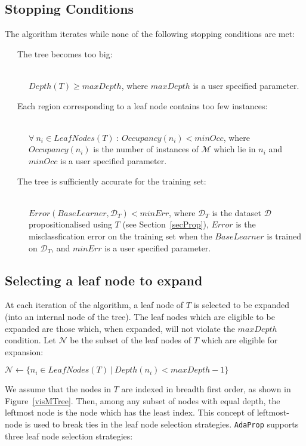 \documentclass[a4paper,12pt]{report} %
\newcommand{\AdaProp}{\texttt{AdaProp}\xspace}
\newcommand{\mcl}[1]{\mathcal{#1}}
\begin{document}
\pagebreak

\subsection{Stopping Conditions}
\label{secStopCond}

The algorithm iterates while none of the following stopping conditions are met:
\begin{description}

\item[~~~The tree becomes too big:] \ \\
    $Depth(T) \geq maxDepth$, 
    where  $maxDepth$ is a user specified parameter.
\item[~~~Each region corresponding to a leaf node contains too few instances:] \ \\ 
    $\forall~n_i \in LeafNodes(T) ~:~ Occupancy(n_i) < minOcc$, 
    where $Occupancy(n_i)$ is the number of instances of $\mcl{M}$ which lie in $n_i$ and
    $minOcc$ is a user specified parameter.
\item[~~~The tree is sufficiently accurate for the training set:] \ \\
    $Error(BaseLearner, \mcl{D}_T) < minErr$, 
    where $\mcl{D}_T$ is the dataset $\mcl{D}$ propositionalised using $T$ (see Section~\ref{secProp}),
    $Error$ is the misclassfication error on the training set when 
    the $BaseLearner$ is trained on $\mcl{D}_T$,
    and $minErr$ is a user specified parameter.

\end{description}

\subsection{Selecting a leaf node to expand}
\label{secTreeBuild}

At each iteration of the algorithm, 
    a leaf node of $T$ is selected to be expanded 
    (into an internal node of the tree).
The leaf nodes which are eligible to be expanded
    are those which, when expanded, will not 
    violate the $maxDepth$ condition.
Let $\mcl{N}$ be the subset of the leaf nodes of $T$ 
    which are eligible for expansion:
\begin{algorithmic}
    \State $\mcl{N} \gets \{ n_i \in LeafNodes(T) ~\big|~ Depth(n_i) < maxDepth - 1 \} $
\end{algorithmic}
We assume that the nodes in $T$ are indexed in breadth first order, 
    as shown in Figure~\ref{visMTree}.
Then, among any subset of nodes with equal depth,
    the leftmost node is the node which has the least index.
This concept of leftmost-node is used to break ties in the 
    leaf node selection strategies.    
\AdaProp supports three leaf node selection strategies:
\end{document}
